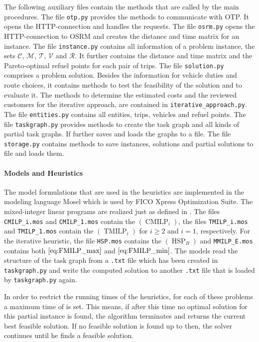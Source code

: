 The following auxiliary files contain the methods that are called by the main procedures. The file \texttt{otp.py} provides the methods to communicate with OTP. It opens the HTTP-connection and handles the requests. The file \texttt{osrm.py} opens the HTTP-connection to OSRM and creates the distance and time matrix for an instance. The file \texttt{instance.py} contains all information of a problem instance, \ie the sets $\mathcal{C}$, $\mathcal{M}$, $\mathcal{T}$, $\mathcal{V}$ and $\mathcal{R}$. It further contains the distance and time matrix and the Pareto-optimal refuel points for each pair of trips. The file \texttt	{solution.py} comprises a problem solution. Besides the information for vehicle duties and route choices, it contains methods to test the feasibility of the solution and to evaluate it. The methods to determine the estimated costs and the reviewed customers for the iterative approach, are contained in \texttt{iterative\_approach.py}. The file \texttt{entities.py} contains all entities, \ie trips, vehicles and refuel points. The file \texttt{taskgraph.py} provides methods to create the task graph and all kinds of partial task graphs. If further saves and loads the graphs to a file. The file \texttt{storage.py} contains methods to save instances, solutions and partial solutions to file and loads them.

\paragraph{Models and Heuristics} \parfill

The model formulations that are used in the heuristics are implemented in the modeling language Mosel which is used by FICO Xpress Optimization Suite. The mixed-integer linear programs are realized just as defined in . The files \texttt{CMILP\_i.mos} and \texttt{CMILP\_1.mos} contain the $(\operatorname{CMILP}_i)$, the files \texttt{TMILP\_i.mos} and \texttt{TMILP\_1.mos} contain the $(\operatorname{TMILP}_i)$ for $i\geq 2$ and $i = 1$, respectively. For the iterative heuristic, the file \texttt{HSP.mos} contains the $(\operatorname{HSP}_B)$ and \texttt{MMILP\_E.mos} contains both $\eqref{eq:FMILP_max}$ and $\eqref{eq:FMILP_min}$. The models read the structure of the task graph from a \texttt{.txt} file which has been created in \texttt{taskgraph.py} and write the computed solution to another \texttt{.txt} file that is loaded by \texttt{taskgraph.py} again.

In order to restrict the running times of the heuristics, for each of these problems a maximum time of is set. This means, if after this time no optimal solution for this partial instance is found, the algorithm terminates and returns the current best feasible solution. If no feasible solution is found up to then, the solver continues until he finds a feasible solution.

